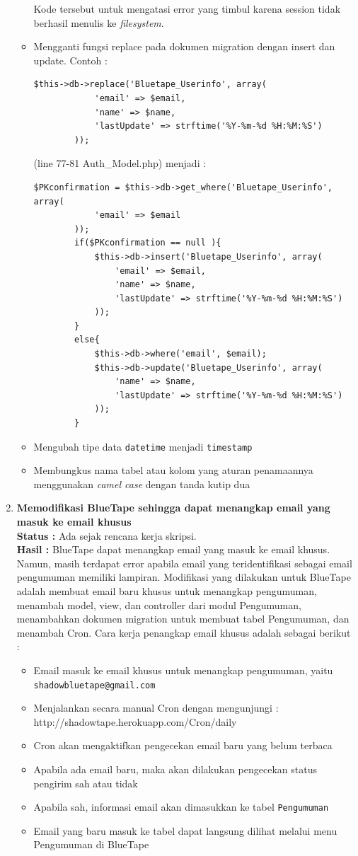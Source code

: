 \documentclass[a4paper,twoside]{article}
\begin{document}
\begin{enumerate}
\begin{itemize}
\begin{lstlisting}
		\end{lstlisting}
		Kode tersebut untuk mengatasi error yang timbul karena session tidak berhasil menulis ke \textit{filesystem}. 
		\item Mengganti fungsi replace pada dokumen migration dengan insert dan update. Contoh :
		\begin{lstlisting}
$this->db->replace('Bluetape_Userinfo', array(
            'email' => $email,
            'name' => $name,
            'lastUpdate' => strftime('%Y-%m-%d %H:%M:%S')
        ));
\end{lstlisting}
(line 77-81 Auth\_Model.php)
menjadi :
\begin{lstlisting}
$PKconfirmation = $this->db->get_where('Bluetape_Userinfo', array(
			'email' => $email
		));
		if($PKconfirmation == null ){
			$this->db->insert('Bluetape_Userinfo', array(
				'email' => $email,
				'name' => $name,
				'lastUpdate' => strftime('%Y-%m-%d %H:%M:%S')
			));
		}
		else{
			$this->db->where('email', $email);
			$this->db->update('Bluetape_Userinfo', array(
				'name' => $name,
				'lastUpdate' => strftime('%Y-%m-%d %H:%M:%S')
			));
		}
\end{lstlisting}

		\item Mengubah tipe data \texttt{datetime} menjadi \texttt{timestamp}
		\item Membungkus nama tabel atau kolom yang aturan penamaannya menggunakan \textit{camel case} dengan tanda kutip dua
	\end{itemize}
		
	\item \textbf{Memodifikasi BlueTape sehingga dapat menangkap email yang masuk ke email khusus}\\
	{\bf Status :} Ada sejak rencana kerja skripsi.\\
	{\bf Hasil :} BlueTape dapat menangkap email yang masuk ke email khusus. Namun, masih terdapat error apabila email yang teridentifikasi sebagai email pengumuman memiliki lampiran. Modifikasi yang dilakukan untuk BlueTape adalah membuat email baru khusus untuk menangkap pengumuman, menambah model, view, dan controller dari modul Pengumuman, menambahkan dokumen migration untuk membuat tabel Pengumuman, dan menambah Cron. Cara kerja penangkap email khusus adalah sebagai berikut :
	\begin{itemize}
		\item Email masuk ke email khusus untuk menangkap pengumuman, yaitu \texttt{shadowbluetape@gmail.com}
		\item Menjalankan secara manual Cron dengan mengunjungi : http://shadowtape.herokuapp.com/Cron/daily
		\item Cron akan mengaktifkan pengecekan email baru yang belum terbaca
		\item Apabila ada email baru, maka akan dilakukan pengecekan status pengirim sah atau tidak
		\item Apabila sah, informasi email akan dimasukkan ke tabel \texttt{Pengumuman}
		\item Email yang baru masuk ke tabel dapat langsung dilihat melalui menu Pengumuman di BlueTape
	\end{itemize}
	

\end{enumerate}
\end{document}
